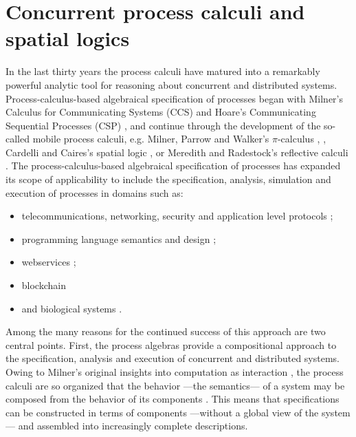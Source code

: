 \section{Concurrent process calculi and spatial logics }\label{sec:concurrent_process_calculi_and_spatial_logics_} %
In the last thirty years the process calculi have matured into a
remarkably powerful analytic tool for reasoning about concurrent and
distributed systems. Process-calculus-based algebraical specification of
processes began with Milner's Calculus for Communicating Systems (CCS)
\cite{DBLP:books/sp/Milner80} and Hoare's Communicating Sequential Processes
(CSP) \cite{DBLP:books/ph/Hoare85}, and continue
through the development of the so-called mobile process calculi,
e.g. Milner, Parrow and Walker's $\pi$-calculus \cite{DBLP:journals/iandc/MilnerPW92a}, \cite{DBLP:journals/iandc/MilnerPW92b},
Cardelli and Caires's spatial logic \cite{DBLP:conf/fossacs/Caires04} \cite{DBLP:journals/iandc/CairesC03} \cite{DBLP:journals/tcs/CairesC04}
\cite{Caires04}, or Meredith and Radestock's reflective calculi
\cite{DBLP:journals/entcs/MeredithR05} \cite{DBLP:conf/tgc/MeredithR05}. The process-calculus-based
algebraical specification of processes has expanded its scope of
applicability to include the specification, analysis, simulation and
execution of processes in domains such as:

\begin{itemize}
\item telecommunications, networking, security and application level protocols
\cite{AbadiB02} 
\cite{AbadiB03} 
\cite{BrownLM05} 
\cite{LaneveZ05}; 
\item programming language semantics and design
\cite{BrownLM05}
\cite{djoin}
\cite{JoCaml}
\cite{WojciechowskiS99};
\item webservices
\cite{BrownLM05}
\cite{LaneveZ05}
\cite{MeredithB03};
\item{blockchain}
  \cite{RChain2022}
\item and biological systems
\cite{Cardelli04}
\cite{DanosL03}
\cite{RegevS03}
\cite{PriamiRSS01}.
\end{itemize}

Among the many reasons for the continued success of this approach are
two central points. First, the process algebras provide a
compositional approach to the specification, analysis and execution of
concurrent and distributed systems. Owing to Milner's original
insights into computation as interaction \cite{Milner93}, the process
calculi are so organized that the behavior ---the semantics--- of a
system may be composed from the behavior of its components
\cite{Fokkink}. This means that specifications can be constructed in
terms of components ---without a global view of the system--- and
assembled into increasingly complete descriptions.

